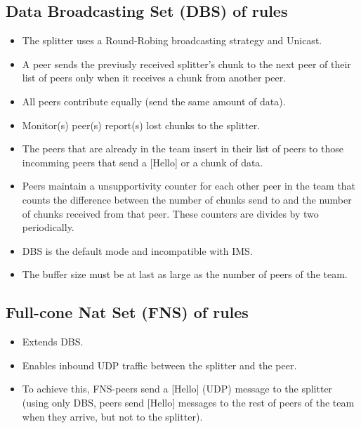 \documentclass{article}
\begin{document}

\subsection{Data Broadcasting Set (DBS) of rules}

\ifx \HCode\Undfef
\else
{}
\fi

\begin{itemize}
\item The splitter uses a Round-Robing broadcasting strategy and Unicast.
\item A peer sends the previusly received splitter's chunk to the next
  peer of their list of peers only when it receives a chunk from
  another peer.
\item All peers contribute equally (send the same amount of data).
\item Monitor(s) peer(s) report(s) lost chunks to the splitter.
\item The peers that are already in the team insert in their list of
  peers to those incomming peers that send a [Hello] or a chunk of
  data.
\item Peers maintain a unsupportivity counter for each other peer in
  the team that counts the difference between the number of chunks
  send to and the number of chunks received from that peer. These
  counters are divides by two periodically.
\item DBS is the default mode and incompatible with IMS.
\item The buffer size must be at last as large as the number of peers
  of the team.
\end{itemize}


\subsection{Full-cone Nat Set (FNS) of rules}

\begin{itemize}
\item Extends DBS.
\item Enables inbound UDP traffic between the splitter and the peer.
\item To achieve this, FNS-peers send a [Hello] (UDP) message to the
  splitter (using only DBS, peers send [Hello] messages to the rest of
  peers of the team when they arrive, but not to the splitter).
\end{itemize}
\end{document}
